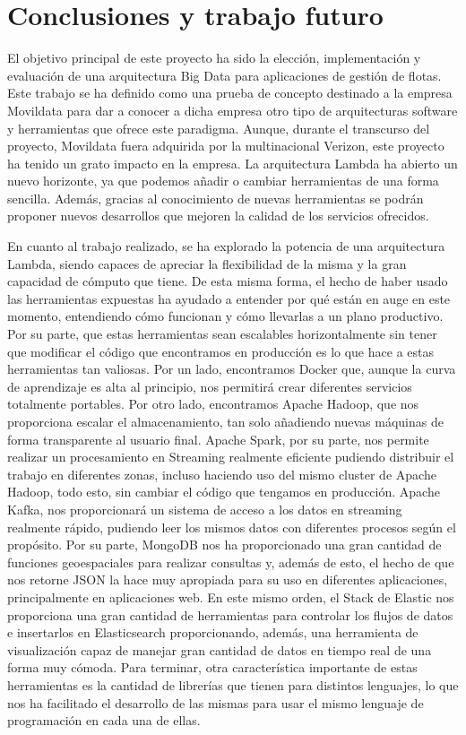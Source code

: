 \chapter{Conclusiones y trabajo futuro}

El objetivo principal de este proyecto ha sido la elección, implementación y evaluación de una arquitectura Big Data para aplicaciones de gestión de flotas. Este trabajo se ha definido como una prueba de concepto destinado a la empresa Movildata para dar a conocer a dicha empresa otro tipo de arquitecturas software y herramientas que ofrece este paradigma. Aunque, durante el transcurso del proyecto, Movildata fuera adquirida por la multinacional Verizon, este proyecto ha tenido un grato impacto en la empresa. La arquitectura Lambda ha abierto un nuevo horizonte, ya que podemos añadir o cambiar herramientas de una forma sencilla. Además, gracias al conocimiento de nuevas herramientas se podrán proponer nuevos desarrollos que mejoren la calidad de los servicios ofrecidos.

En cuanto al trabajo realizado, se ha explorado la potencia de una arquitectura Lambda, siendo capaces de apreciar la flexibilidad de la misma y la gran capacidad de cómputo que tiene. De esta misma forma, el hecho de haber usado las herramientas expuestas ha ayudado a entender por qué están en auge en este momento, entendiendo cómo funcionan y cómo llevarlas a un plano productivo. Por su parte, que estas herramientas sean escalables horizontalmente sin tener que modificar el código que encontramos en producción es lo que hace a estas herramientas tan valiosas. Por un lado, encontramos Docker que, aunque la curva de aprendizaje es alta al principio, nos permitirá crear diferentes servicios totalmente portables. Por otro lado, encontramos Apache Hadoop, que nos proporciona escalar el almacenamiento, tan solo añadiendo nuevas máquinas de forma transparente al usuario final. Apache Spark, por su parte, nos permite realizar un procesamiento en Streaming realmente eficiente pudiendo distribuir el trabajo en diferentes zonas, incluso haciendo uso del mismo cluster de Apache Hadoop, todo esto, sin cambiar el código que tengamos en producción. Apache Kafka, nos proporcionará un sistema de acceso a los datos en streaming realmente rápido, pudiendo leer los mismos datos con diferentes procesos según el propósito. Por su parte, MongoDB nos ha proporcionado una gran cantidad de funciones geoespaciales para realizar consultas y, además de esto, el hecho de que nos retorne JSON la hace muy apropiada para su uso en diferentes aplicaciones, principalmente en aplicaciones web. En este mismo orden, el Stack de Elastic nos proporciona una gran cantidad de herramientas para controlar los flujos de datos e insertarlos en Elasticsearch proporcionando, además, una herramienta de visualización capaz de manejar gran cantidad de datos en tiempo real de una forma muy cómoda. Para terminar, otra característica importante de estas herramientas es la cantidad de librerías que tienen para distintos lenguajes, lo que nos ha facilitado el desarrollo de las mismas para usar el mismo lenguaje de programación en cada una de ellas.

